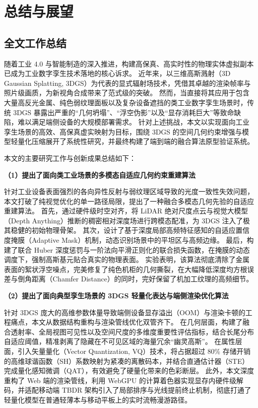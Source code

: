 \chapter{总结与展望}
\label{chap:conclusion_and_future_work}

\section{全文工作总结}
\label{sec:conclusion_summary}

随着工业 4.0 与智能制造的深入推进，构建高保真、高实时性的物理实体虚拟副本已成为工业数字孪生技术落地的核心诉求。
近年来，以三维高斯溅射（3D Gaussian Splatting, 3DGS）为代表的显式辐射场技术，凭借其卓越的渲染帧率与照片级画质，为新视角合成带来了范式级的突破。
然而，当直接将其应用于包含大量高反光金属、纯色弱纹理面板以及复杂设备遮挡的类工业数字孪生场景时，传统 3DGS 暴露出严重的“几何坍塌”、“浮空伪影”以及“显存消耗巨大”等致命缺陷，难以满足端侧设备的大规模部署需求。
针对上述挑战，本文以实现面向工业孪生场景的高效、高保真虚实映射为目标，围绕 3DGS 的空间几何约束增强与模型轻量化压缩展开了系统性研究，并最终构建了端到端的融合算法原型验证系统。

本文的主要研究工作与创新成果总结如下：

\textbf{（1）提出了面向类工业场景的多模态自适应几何约束重建算法}

针对工业设备表面强烈的各向异性反射与弱纹理区域导致的光度一致性失效问题，本文打破了纯视觉优化的单一路径局限，提出了一种融合多模态几何先验的自适应重建算法。
首先，通过硬件级时空对齐，将 LiDAR 绝对尺度点云与视觉大模型（Depth Anything）推断的稠密相对深度场进行跨模态配准，为 3DGS 注入了极其稳健的初始物理骨架。
其次，设计了基于深度局部高频特征感知的自适应置信度掩膜（Adaptive Mask）机制，动态识别场景中的平坦区与高频边缘。
最后，构建了联合 Huber 深度惩罚与一阶法向平滑正则化的联合损失函数，在掩膜的动态调度下，强制高斯基元贴合真实的物理表面。
实验表明，该算法彻底清除了金属表面的絮状浮空噪点，完美修复了纯色机柜的几何撕裂，在大幅降低深度均方根误差与倒角距离（Chamfer Distance）的同时，完好保留了机加工纹理的高频细节。

\textbf{（2）提出了面向典型孪生场景的 3DGS 轻量化表达与端侧渲染优化算法}

针对 3DGS 庞大的高维参数体量导致端侧设备显存溢出（OOM）与渲染卡顿的工程痛点，本文从数据结构重构与渲染管线优化双管齐下。
在几何层面，构建了融合透射率、全局视图可见性以及空间尺度的多维度重要性评估指标，结合长尾分布自适应阈值，精准剥离了隐藏在不可见区域的海量冗余“幽灵高斯”。
在属性层面，引入矢量量化（Vector Quantization, VQ）技术，将占据超过 80\% 存储开销的高维球谐函数（SH）系数映射为紧凑的离散码本，并结合直通估计器（STE）完成量化感知微调（QAT），有效避免了硬量化带来的色彩断层。
此外，本文深度重构了 Web 端的渲染管线，利用 WebGPU 的计算着色器实现显存内硬件级解码，并适配移动端 TBDR 架构引入了局部排序与光线提前终止机制，彻底打通了轻量化模型在普通轻薄本与移动平板上的实时流畅漫游路径。

